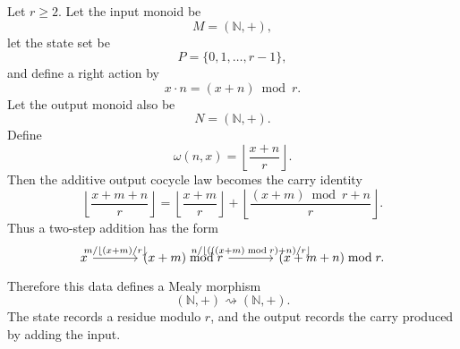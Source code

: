\begin{example}
\label{example:base-r-carry-machine}
    Let \(r\geq 2\). Let the input monoid be
    \[
        M=(\mathbb N,+),
    \]
    let the state set be
    \[
        P=\{0,1,\dots,r-1\},
    \]
    and define a right action by
    \[
        x\cdot n=(x+n)\bmod r.
    \]
    Let the output monoid also be
    \[
        N=(\mathbb N,+).
    \]
    Define
    \[
        \omega(n,x)=\left\lfloor\frac{x+n}{r}\right\rfloor.
    \]
    Then the additive output cocycle law becomes the carry identity
    \[
        \left\lfloor\frac{x+m+n}{r}\right\rfloor
        =
        \left\lfloor\frac{x+m}{r}\right\rfloor
        +
        \left\lfloor
        \frac{(x+m)\bmod r+n}{r}
        \right\rfloor.
    \]
    Thus a two-step addition has the form
    \[
        \begin{tikzcd}[column sep=large]
                x
                    \arrow[r, "{m/\left\lfloor (x+m)/r\right\rfloor}"]
            &
                (x+m)\bmod r
                    \arrow[r, "{n/\left\lfloor (((x+m)\bmod r)+n)/r\right\rfloor}"]
            &
                (x+m+n)\bmod r.
        \end{tikzcd}
    \]
    Therefore this data defines a Mealy morphism
    \[
        (\mathbb N,+)\rightsquigarrow(\mathbb N,+).
    \]
    The state records a residue modulo \(r\), and the output records the carry produced by adding the input.
\end{example}

